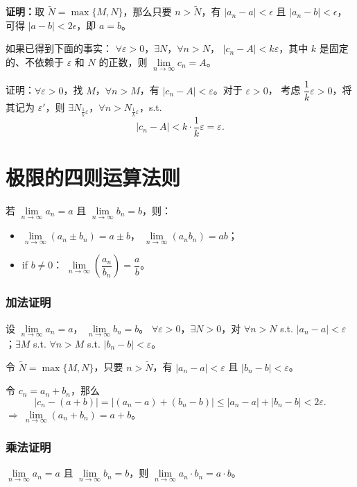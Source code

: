 \documentclass[UTF8,11pt]{ctexart}
\theoremstyle{cnthm}
\begin{document}
\textbf{证明：}\quad 取 $\tilde N=\max\{M,N\}$，那么只要
$n>\tilde N$，有 $|a_n-a|<\epsilon$ 且 $|a_n-b|<\epsilon$，
可得 $|a-b|<2\epsilon$，即 $a=b$。

如果已得到下面的事实：
$\forall\varepsilon>0$，$\exists N$，$\forall n>N$，
$|c_n-A|<k\varepsilon$，其中 $k$ 是固定的、不依赖于
$\varepsilon$ 和 $N$ 的正数，则
$\lim\limits_{n\to\infty}c_n=A$。

证明：$\forall\varepsilon>0$，找 $M$，$\forall n>M$，有
$|c_n-A|<\varepsilon$。对于 $\varepsilon>0$，
考虑 $\dfrac1k\varepsilon>0$，将其记为 $\varepsilon'$，则
$\exists N_{\frac1k\varepsilon}$，$\forall n>N_{\frac1k\varepsilon}$，s.t.
\[
|c_n-A|<k\cdot\frac1k\varepsilon=\varepsilon .
\]

\section{极限的四则运算法则}

若 $\lim\limits_{n\to\infty}a_n=a$ 且
$\lim\limits_{n\to\infty}b_n=b$，则：

\begin{itemize}
\item $\lim\limits_{n\to\infty}(a_n\pm b_n)=a\pm b$，
$\lim\limits_{n\to\infty}(a_nb_n)=ab$；
\item if $b\neq0$：
$\lim\limits_{n\to\infty}\left(\dfrac{a_n}{b_n}\right)=\dfrac ab$。
\end{itemize}

\subsubsection*{加法证明}

设 $\lim\limits_{n\to\infty}a_n=a$，
$\lim\limits_{n\to\infty}b_n=b$。
$\forall\varepsilon>0$，$\exists N>0$，对 $\forall n>N$ s.t.
$|a_n-a|<\varepsilon$；$\exists M$ s.t. $\forall n>M$ s.t.
$|b_n-b|<\varepsilon$。

令 $\tilde N=\max\{M,N\}$，只要 $n>\tilde N$，有
$|a_n-a|<\varepsilon$ 且 $|b_n-b|<\varepsilon$。

令 $c_n=a_n+b_n$，那么
\[
|c_n-(a+b)|=|(a_n-a)+(b_n-b)|
\leq|a_n-a|+|b_n-b|<2\varepsilon .
\]
$\Longrightarrow\ \lim\limits_{n\to\infty}(a_n+b_n)=a+b$。

\subsubsection*{乘法证明}

$\lim\limits_{n\to\infty}a_n=a$ 且
$\lim\limits_{n\to\infty}b_n=b$，则
$\lim\limits_{n\to\infty}a_n\cdot b_n=a\cdot b$。
\end{document}
